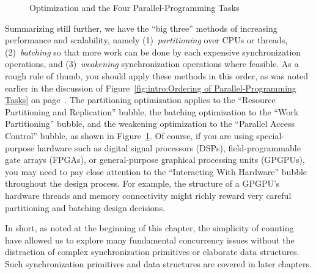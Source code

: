 \begin{figure}[tb]
\centering
{}
\caption{Optimization and the Four Parallel-Programming Tasks}
\label{fig:count:Optimization and the Four Parallel-Programming Tasks}
\end{figure}

Summarizing still further, we have the ``big three'' methods of
increasing performance and scalability, namely
(1)~\emph{partitioning} over CPUs or threads,
(2)~\emph{batching} so that more work can be done by each expensive
synchronization operations, and
(3)~\emph{weakening} synchronization operations where feasible.
As a rough rule of thumb, you should apply these methods in this order,
as was noted earlier in the discussion of
Figure~\ref{fig:intro:Ordering of Parallel-Programming Tasks}
on
page~\pageref{fig:intro:Ordering of Parallel-Programming Tasks}.
The partitioning optimization applies to the
``Resource Partitioning and Replication'' bubble,
the batching optimization to the ``Work Partitioning'' bubble,
and the weakening optimization to the ``Parallel Access Control'' bubble,
as shown in
Figure~\ref{fig:count:Optimization and the Four Parallel-Programming Tasks}.
Of course, if you are using special-purpose hardware such as
digital signal processors (DSPs), field-programmable gate arrays (FPGAs),
or general-purpose graphical processing units (GPGPUs), you may need
to pay close attention to the ``Interacting With Hardware'' bubble
throughout the design process.
For example, the structure of a GPGPU's hardware threads and memory
connectivity might richly reward very careful partitioning
and batching design decisions.

In short, as noted at the beginning of this chapter, the simplicity
of counting have allowed us to explore many
fundamental concurrency issues without the distraction of
complex synchronization primitives or elaborate data structures.
Such synchronization primitives and data structures are covered
in later chapters.


